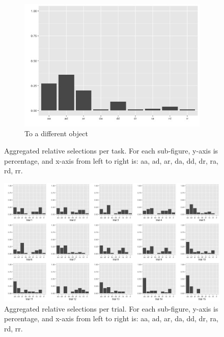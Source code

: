 \documentclass{article}
\begin{document}
\begin{figure}
\begin{subfigure}[t]{0.25\textwidth}
    \includegraphics[width=\linewidth]{agg_g5} 
    \caption{To a different object} \label{fig:agg_g5}
  \end{subfigure}
  \caption{Aggregated relative selections per task. For each sub-figure, y-axis is percentage, and x-axis from left to right is: aa, ad, ar, da, dd, dr, ra, rd, rr.}
\end{figure}

\begin{figure}
  \centering
  \includegraphics[width=\linewidth]{agg_trials}
  \caption{Aggregated relative selections per trial. For each sub-figure, y-axis is percentage, and x-axis from left to right is: aa, ad, ar, da, dd, dr, ra, rd, rr.}
\end{figure}
\end{document}
